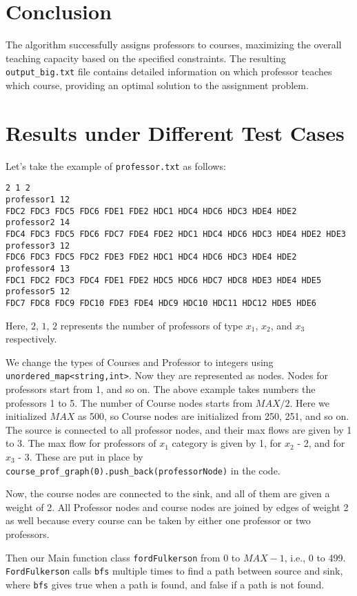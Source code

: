 \documentclass{article}
\begin{document}
\section*{Conclusion}
The algorithm successfully assigns professors to courses, maximizing the overall teaching capacity based on the specified constraints. The resulting \texttt{output\_big.txt} file contains detailed information on which professor teaches which course, providing an optimal solution to the assignment problem.

\section*{Results under Different Test Cases}
Let's take the example of \texttt{professor.txt} as follows:

\begin{verbatim}
2 1 2
professor1 12
FDC2 FDC3 FDC5 FDC6 FDE1 FDE2 HDC1 HDC4 HDC6 HDC3 HDE4 HDE2
professor2 14
FDC4 FDC3 FDC5 FDC6 FDC7 FDE4 FDE2 HDC1 HDC4 HDC6 HDC3 HDE4 HDE2 HDE3
professor3 12
FDC6 FDC3 FDC5 FDC2 FDE3 FDE2 HDC1 HDC4 HDC6 HDC3 HDE4 HDE2
professor4 13
FDC1 FDC2 FDC3 FDC4 FDE1 FDE2 HDC5 HDC6 HDC7 HDC8 HDE3 HDE4 HDE5
professor5 12
FDC7 FDC8 FDC9 FDC10 FDE3 FDE4 HDC9 HDC10 HDC11 HDC12 HDE5 HDE6
\end{verbatim}

Here, \(2\), \(1\), \(2\) represents the number of professors of type \(x_1\), \(x_2\), and \(x_3\) respectively.

We change the types of Courses and Professor to integers using \texttt{unordered\_map<string,int>}. Now they are represented as nodes. Nodes for professors start from 1, and so on. The above example takes numbers the professors 1 to 5. The number of Course nodes starts from \(MAX/2\). Here we initialized \(MAX\) as 500, so Course nodes are initialized from 250, 251, and so on. The source is connected to all professor nodes, and their max flows are given by 1 to 3. The max flow for professors of \(x_1\) category is given by 1, for \(x_2\) - 2, and for \(x_3\) - 3. These are put in place by \texttt{course\_prof\_graph(0).push\_back(professorNode)} in the code.

Now, the course nodes are connected to the sink, and all of them are given a weight of 2. All Professor nodes and course nodes are joined by edges of weight 2 as well because every course can be taken by either one professor or two professors.

Then our Main function class \texttt{fordFulkerson} from 0 to \(MAX-1\), i.e., 0 to 499. \texttt{FordFulkerson} calls \texttt{bfs} multiple times to find a path between source and sink, where \texttt{bfs} gives true when a path is found, and false if a path is not found.
\end{document}
